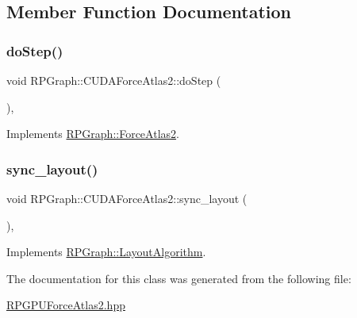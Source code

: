 \subsection{Member Function Documentation}
\mbox{\label{classRPGraph_1_1CUDAForceAtlas2_a4ebfb858b5c2c19b9e57ef1d434a21a7}} 
\subsubsection{\texorpdfstring{do\+Step()}{doStep()}}
{\footnotesize\ttfamily void R\+P\+Graph\+::\+C\+U\+D\+A\+Force\+Atlas2\+::do\+Step (\begin{DoxyParamCaption}{ }\end{DoxyParamCaption})\hspace{0.3cm}{\ttfamily [override]}, {\ttfamily [virtual]}}



Implements \mbox{\hyperlink{classRPGraph_1_1ForceAtlas2_aa448ceec8292797a6e1b61ef8e2b3744}{R\+P\+Graph\+::\+Force\+Atlas2}}.

\mbox{\label{classRPGraph_1_1CUDAForceAtlas2_a474a1cd717352057859185885b8020cf}} 
\subsubsection{\texorpdfstring{sync\+\_\+layout()}{sync\_layout()}}
{\footnotesize\ttfamily void R\+P\+Graph\+::\+C\+U\+D\+A\+Force\+Atlas2\+::sync\+\_\+layout (\begin{DoxyParamCaption}{ }\end{DoxyParamCaption})\hspace{0.3cm}{\ttfamily [override]}, {\ttfamily [virtual]}}



Implements \mbox{\hyperlink{classRPGraph_1_1LayoutAlgorithm_a70f3171d513b92d44f4784ff96c848c1}{R\+P\+Graph\+::\+Layout\+Algorithm}}.



The documentation for this class was generated from the following file\+:\begin{DoxyCompactItemize}
\item 
\mbox{\hyperlink{RPGPUForceAtlas2_8hpp}{R\+P\+G\+P\+U\+Force\+Atlas2.\+hpp}}\end{DoxyCompactItemize}

